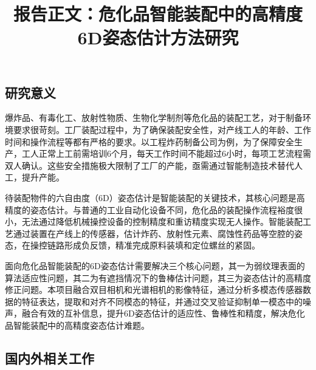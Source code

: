 \documentclass[12pt]{article}
\begin{document}

\title{报告正文：危化品智能装配中的高精度6D姿态估计方法研究}

\maketitle




\subsection{研究意义}

爆炸品、有毒化工、放射性物质、生物化学制剂等危化品的装配工艺，对于制备环境要求很苛刻。工厂装配过程中，为了确保装配安全性，对产线工人的年龄、工作时间和操作流程等都有严格的要求。以工程炸药制备公司为例，为了保障安全生产，工人正常上工前需培训6个月，每天工作时间不能超过6小时，每项工艺流程需双人确认。这些安全措施极大限制了工厂的产能，亟需通过智能制造技术替代人工，提升产能。

待装配物件的六自由度（6D）姿态估计是智能装配的关键技术，其核心问题是高精度的姿态估计。与普通的工业自动化设备不同，危化品的装配操作流程裕度很小，无法通过降低机械操控设备的控制精度和重访精度实现无人操作。智能装配工艺通过装置在产线上的传感器，估计炸药、放射性元素、腐蚀性药品等空腔的姿态，在操控链路形成负反馈，精准完成原料装填和定位螺丝的紧固。

面向危化品智能装配的6D姿态估计需要解决三个核心问题，其一为弱纹理表面的算法适应性问题，其二为有遮挡情况下的鲁棒估计问题，其三为姿态估计的高精度修正问题。本项目融合双目相机和光谱相机的影像特征，通过分析多模态传感器数据的特征表达，提取和对齐不同模态的特征，并通过交叉验证抑制单一模态中的噪声，融合有效的互补信息，提升6D姿态估计的适应性、鲁棒性和精度，解决危化品智能装配中的高精度姿态估计难题。

\subsection{国内外相关工作}
\end{document}

